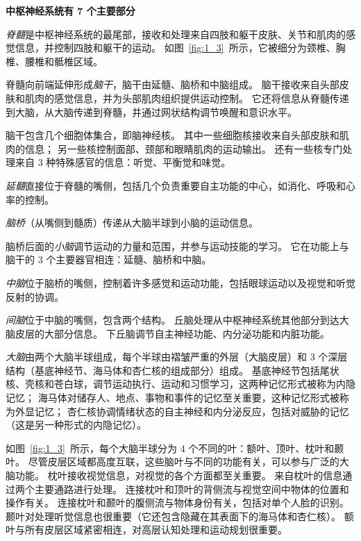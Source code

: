\begin{proposition}[中枢神经系统的解剖学组织] \label{box:1_2}
	\textbf{中枢神经系统有 7 个主要部分}
	
	\quad \quad \textit{脊髓}是中枢神经系统的最尾部，接收和处理来自四肢和躯干皮肤、关节和肌肉的感觉信息，并控制四肢和躯干的运动。
	如图~\ref{fig:1_3}~所示，它被细分为颈椎、胸椎、腰椎和骶椎区域。
	
	\quad \quad 脊髓向前端延伸形成\textit{脑干}，脑干由延髓、脑桥和中脑组成。
	脑干接收来自头部皮肤和肌肉的感觉信息，并为头部肌肉组织提供运动控制。
	它还将信息从脊髓传递到大脑，从大脑传递到脊髓，并通过网状结构调节唤醒和意识水平。
	
	\quad \quad 脑干包含几个细胞体集合，即脑神经核。
	其中一些细胞核接收来自头部皮肤和肌肉的信息；
	另一些核控制面部、颈部和眼睛肌肉的运动输出。
	还有一些核专门处理来自 3 种特殊感官的信息：听觉、平衡觉和味觉。
	
	\quad \quad \textit{延髓}直接位于脊髓的嘴侧，包括几个负责重要自主功能的中心，如消化、呼吸和心率的控制。
	
	\quad \quad \textit{脑桥}（从嘴侧到髓质）传递从大脑半球到小脑的运动信息。
	
	\quad \quad 脑桥后面的\textit{小脑}调节运动的力量和范围，并参与运动技能的学习。
	它在功能上与脑干的 3 个主要器官相连：延髓、脑桥和中脑。
	
	\quad \quad \textit{中脑}位于脑桥的嘴侧，控制着许多感觉和运动功能，包括眼球运动以及视觉和听觉反射的协调。
	
	\quad \quad \textit{间脑}位于中脑的嘴侧，包含两个结构。
	丘脑处理从中枢神经系统其他部分到达大脑皮层的大部分信息。
	下丘脑调节自主神经功能、内分泌功能和内脏功能。
	
	\quad \quad \textit{大脑}由两个大脑半球组成，每个半球由褶皱严重的外层（大脑皮层）和 3 个深层结构（基底神经节、海马体和杏仁核的组成部分）组成。
	基底神经节包括尾状核、壳核和苍白球，调节运动执行、运动和习惯学习，这两种记忆形式被称为内隐记忆；
	海马体对储存人、地点、事物和事件的记忆至关重要，这种记忆形式被称为外显记忆；
	杏仁核协调情绪状态的自主神经和内分泌反应，包括对威胁的记忆（这是另一种形式的内隐记忆）。
	
	\quad \quad 如图~\ref{fig:1_3}~所示，每个大脑半球分为 4 个不同的叶：额叶、顶叶、枕叶和颞叶。
	尽管皮层区域都高度互联，这些脑叶与不同的功能有关，可以参与广泛的大脑功能。
	枕叶接收视觉信息，对视觉的各个方面都至关重要。
	来自枕叶的信息通过两个主要通路进行处理。
	连接枕叶和顶叶的背侧流与视觉空间中物体的位置和操作有关。
	连接枕叶和颞叶的腹侧流与物体身份有关，包括对单个人脸的识别。
	颞叶对处理听觉信息也很重要（它还包含隐藏在其表面下的海马体和杏仁核）。
	额叶与所有皮层区域紧密相连，对高层认知处理和运动规划很重要。
	

\end{proposition}
